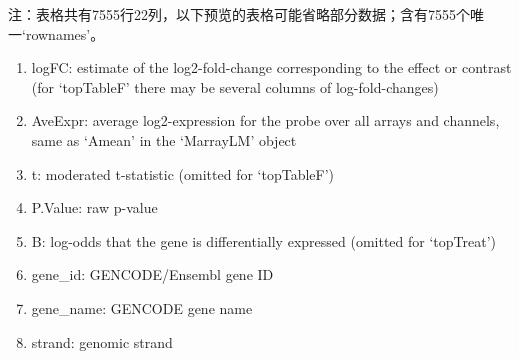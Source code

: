\documentclass[
]{article}
\providecommand{\tightlist}{%
  \setlength{\itemsep}{0pt}\setlength{\parskip}{0pt}}
\begin{document}
\begin{center}\begin{tcolorbox}[colback=gray!10, colframe=gray!50, width=0.9\linewidth, arc=1mm, boxrule=0.5pt]注：表格共有7555行22列，以下预览的表格可能省略部分数据；含有7555个唯一`rownames'。
\end{tcolorbox}
\end{center}
\begin{center}\begin{tcolorbox}[colback=gray!10, colframe=gray!50, width=0.9\linewidth, arc=1mm, boxrule=0.5pt]\begin{enumerate}\tightlist
\item logFC:  estimate of the log2-fold-change corresponding to the effect or contrast (for ‘topTableF’ there may be several columns of log-fold-changes)
\item AveExpr:  average log2-expression for the probe over all arrays and channels, same as ‘Amean’ in the ‘MarrayLM’ object
\item t:  moderated t-statistic (omitted for ‘topTableF’)
\item P.Value:  raw p-value
\item B:  log-odds that the gene is differentially expressed (omitted for ‘topTreat’)
\item gene\_id:  GENCODE/Ensembl gene ID
\item gene\_name:  GENCODE gene name
\item strand:  genomic strand
\end{enumerate}\end{tcolorbox}
\end{center}
\end{document}
